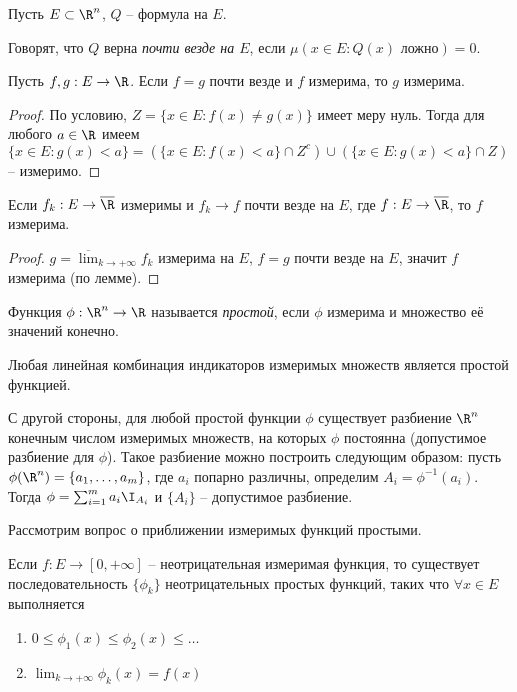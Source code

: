 \begin{definition}
    Пусть $E \subset \R^{n}$, $Q$ -- формула на $E$.

    Говорят, что $Q$ верна \textit{почти везде на $E$}, если $\mu(x \in E: Q(x) \text{ ложно}) = 0$.
\end{definition}

\begin{lemma}
    Пусть $f, g: E \to \R$. Если $f = g$ почти везде и $f$ измерима, то $g$ измерима.
\end{lemma}

\begin{proof}
    По условию, $Z = \{x \in E: f(x) \neq g(x)\}$ имеет меру нуль. Тогда для любого $a \in \R$ имеем $\{x \in E: g(x) < a\} = (\{x \in E : f(x) < a\} \cap Z^{c})\cup(\{x \in E: g(x) < a\}\cap Z)$ -- измеримо.
\end{proof}

\begin{corollary}
    Если $f_{k}: E \to \overline{\R}$ измеримы и $f_{k} \to f$ почти везде на $E$, где $f: E \to \overline{\R}$, то $f$ измерима.
\end{corollary}

\begin{proof}
    $g = \overline{\lim}_{k \to +\infty}f_{k}$ измерима на $E$, $f = g$ почти везде на $E$, значит $f$ измерима (по лемме).
\end{proof}

\begin{definition}
    Функция $\phi: \R^{n} \to \R$ называется \textit{простой}, если $\phi$ измерима и множество её значений конечно.
\end{definition}

\begin{note}
    Любая линейная комбинация индикаторов измеримых множеств является простой функцией.

    С другой стороны, для любой простой функции $\phi$ существует разбиение $\R^{n}$ конечным числом измеримых множеств, на которых $\phi$ постоянна (допустимое разбиение для $\phi$). Такое разбиение можно построить следующим образом: пусть $\phi(\R^{n}) = \{a_{1}, \ldots, a_{m}\}$, где $a_{i}$ попарно различны, определим $A_{i} = \phi^{-1}(a_{i})$. Тогда $\phi = \sum_{i = 1}^{m}a_{i} \I_{A_{i}}$ и $\{A_{i}\}$ -- допустимое разбиение.
\end{note}

Рассмотрим вопрос о приближении измеримых функций простыми.

\begin{theorem}
    Если $f: E \to [0, +\infty]$ -- неотрицательная измеримая функция, то существует последовательность $\{\phi_{k}\}$ неотрицательных простых функций, таких что $\forall x \in E$ выполняется
    \begin{enumerate}
        \item $0 \leq \phi_{1}(x) \leq \phi_{2}(x) \leq \ldots$
        \item $\lim_{k \to +\infty}\phi_{k}(x) = f(x)$
    \end{enumerate}
\end{theorem}

